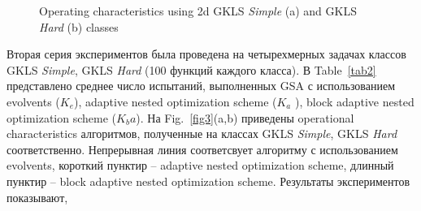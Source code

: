 \documentclass[runningheads]{llncs}
\begin{document}
\begin{figure}
\begin{minipage}{0.5\linewidth}
\end{minipage}
\begin{minipage}{0.5\linewidth}
\end{minipage}
\caption{Operating characteristics using 2d GKLS \textit{Simple} (a) and GKLS \textit{Hard} (b) classes}
\label{fig2}
\end{figure}

Вторая серия экспериментов была проведена на четырехмерных задачах классов GKLS \textit{Simple}, GKLS \textit{Hard} (100 функций каждого класса). В Table~\ref{tab2}  представлено среднее число испытаний, выполненных GSA с использованием evolvents ($K_e$), adaptive nested optimization scheme ($K_a$ ), block adaptive nested optimization scheme ($K_ba$). 
На Fig.~\ref{fig3}(a,b) приведены operational characteristics алгоритмов, полученные на классах GKLS \textit{Simple}, GKLS \textit{Hard} соответственно. Непрерывная линия соответсвует алгоритму с использованием evolvents, короткий пунктир -- adaptive nested optimization scheme, длинный пунктир -- block adaptive nested optimization scheme. 
Результаты экспериментов показывают,
\end{document}
